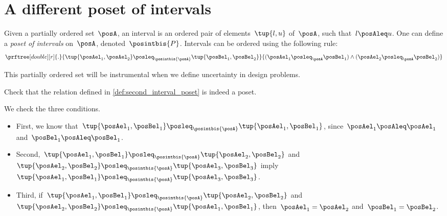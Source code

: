 
\section{A different poset of intervals}
\begin{definition}
    \label{def:second_interval_poset}
    Given a partially ordered set~$\posA$, an interval is an ordered pair of elements~$\tup{l,u}$ of~$\posA$, such that~$l\posAleq u$.
    One can define a \emph{poset of intervals} on~$\posA$, denoted~$\posintbis{P}$.
    Intervals can be ordered using the following rule:
    \begin{equation}
        \prftree[double][r]{.}{\tup{\posAel_1,\posAel_2}\posleq_{\posintbis{\posA}}\tup{\posBel_1,\posBel_2}}{(\posAel_1\posleq_\posA \posBel_1) \wedge (\posAel_2\posleq_\posA \posBel_2)}
    \end{equation}
\end{definition}

This partially ordered set will be instrumental when we define uncertainty in design problems.

\begin{exercise}
    Check that the relation defined in \cref{def:second_interval_poset} is indeed a poset.
\end{exercise}
\begin{solution}
    We check the three conditions.
    \begin{itemize}
        \item First, we know that~$\tup{\posAel_1,\posBel_1}\posleq_{\posintbis{\posA}}\tup{\posAel_1,\posBel_1}$, since~$\posAel_1\posAleq \posAel_1$ and~$\posBel_1\posAleq \posBel_1$.
        \item Second,~$\tup{\posAel_1,\posBel_1}\posleq_{\posintbis{\posA}}\tup{\posAel_2,\posBel_2}$ and~$\tup{\posAel_2,\posBel_2}\posleq_{\posintbis{\posA}}\tup{\posAel_3,\posBel_3}$ imply~$\tup{\posAel_1,\posBel_1}\posleq_{\posintbis{\posA}}\tup{\posAel_3,\posBel_3}$.
        \item Third, if~$\tup{\posAel_1,\posBel_1}\posleq_{\posintbis{\posA}}\tup{\posAel_2,\posBel_2}$ and~$\tup{\posAel_2,\posBel_2}\posleq_{\posintbis{\posA}}\tup{\posAel_1,\posBel_1}$, then~$\posAel_1=\posAel_2$ and~$\posBel_1=\posBel_2$.
    \end{itemize}
\end{solution}

